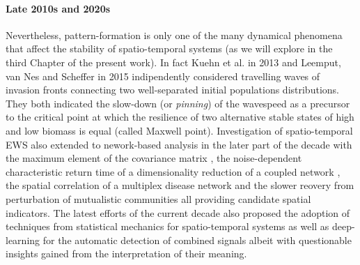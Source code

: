 \documentclass[../main.tex]{subfiles}
\begin{document}
\paragraph{Late 2010s and 2020s}
Nevertheless, pattern-formation is only one of the many dynamical phenomena that affect the stability of spatio-temporal systems (as we will explore in the third Chapter of the present work). 
In fact Kuehn et al. in 2013 \cite{Kuehn13} and Leemput, van Nes and Scheffer in 2015 \cite{Leemput15} indipendently considered travelling waves of invasion fronts connecting two well-separated initial populations distributions. They both indicated the slow-down (or \textit{pinning}) of the wavespeed as a precursor to the critical point at which the resilience of two alternative stable states of high and low biomass is equal (called Maxwell point).
Investigation of spatio-temporal EWS also extended to nework-based analysis in the later part of the decade with the maximum element of the covariance matrix \cite{Suweis14}, the noise-dependent characteristic return time of a dimensionality reduction of a coupled network \cite{Liang17}, the spatial correlation of a multiplex disease network \cite{Jentsch18} and the slower reovery from perturbation of mutualistic communities \cite{Lever20} all providing candidate spatial indicators.
The latest efforts of the current decade also proposed the adoption of techniques from statistical mechanics \cite{Chen19,Gottwald20,Donovan22} for spatio-temporal systems as well as deep-learning \cite{Bury21,Dylewsky23} for the automatic detection of combined signals albeit with questionable insights gained from the interpretation of their meaning. 
\end{document}
